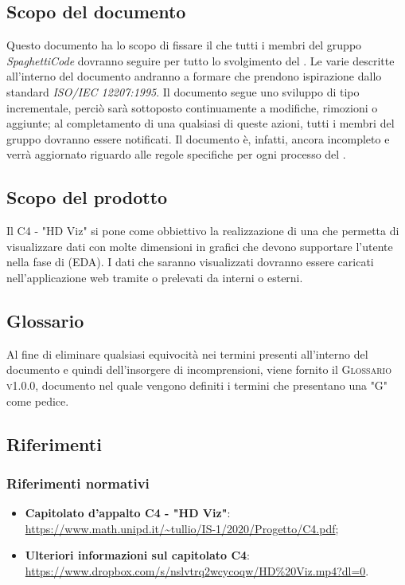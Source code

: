 \documentclass[../norme_di_progetto.tex]{subfiles}
\begin{document}
\subsection{Scopo del documento}
Questo documento ha lo scopo di fissare il  che tutti i membri del gruppo \emph{SpaghettiCode} dovranno seguire per tutto lo svolgimento del . Le varie  descritte all'interno del documento andranno a formare  che prendono ispirazione dallo standard \emph{ISO/IEC 12207:1995}. Il documento segue uno sviluppo di tipo incrementale, perciò sarà sottoposto continuamente a modifiche, rimozioni o aggiunte; al completamento di una qualsiasi di queste azioni, tutti i membri del gruppo dovranno essere notificati. Il documento è, infatti, ancora incompleto e verrà aggiornato riguardo alle regole specifiche per ogni processo del .

\subsection{Scopo del prodotto}
Il  C4 - "HD Viz" si pone come obbiettivo la realizzazione di una  che permetta di visualizzare dati con molte dimensioni in grafici che devono supportare l'utente nella fase di  (EDA).
I dati che saranno visualizzati dovranno essere caricati nell'applicazione web tramite  o prelevati da  interni o esterni.

\subsection{Glossario}
Al fine di eliminare qualsiasi equivocità nei termini presenti all'interno del documento e quindi dell'insorgere di incomprensioni, viene fornito il \textsc{Glossario v1.0.0}, documento nel quale vengono definiti i termini che presentano una "G" come pedice.

\subsection{Riferimenti}
\subsubsection{Riferimenti normativi}
\begin{itemize}
    \item \textbf{Capitolato d'appalto C4 - "HD Viz"}: \\
    \url{https://www.math.unipd.it/~tullio/IS-1/2020/Progetto/C4.pdf};
    \item \textbf{Ulteriori informazioni sul capitolato C4}: \\
    \url{https://www.dropbox.com/s/nslvtrq2wcycoqw/HD\%20Viz.mp4?dl=0}.
\end{itemize}
\end{document}
